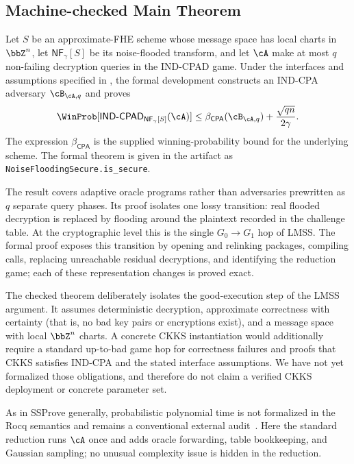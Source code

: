 \subsection{Machine-checked Main Theorem}
\label{sec:scope}

Let \(S\) be an approximate-FHE scheme whose message space has local charts in
\(\bbZ^n\), let \(\mathsf{NF}_{\gamma}[S]\) be its noise-flooded transform, and
let \(\cA\) make at most \(q\) non-failing decryption queries in the IND-CPAD
game.
Under the interfaces and assumptions specified in
, the formal development constructs an IND-CPA
adversary \(\cB_{\cA,q}\) and proves
\begin{equation}
\label{eq:headline}
 \WinProb[\mathsf{IND\text{-}CPAD}_{\mathsf{NF}_{\gamma}[S]}(\cA)]
 \leq
 \beta_{\mathsf{CPA}}(\cB_{\cA,q})+
 \frac{\sqrt{qn}}{2\gamma}.
\end{equation}
The expression \(\beta_{\mathsf{CPA}}\) is the supplied winning-probability
bound for the underlying scheme.
The formal theorem is given in the artifact as
\texttt{NoiseFloodingSecure.is\_secure}.

The result covers adaptive oracle programs rather than adversaries prewritten as \(q\) separate query phases.
Its proof isolates one lossy transition: real flooded decryption is replaced by flooding around the plaintext recorded in the challenge table.
At the cryptographic level this is the single \(G_0\to G_1\) hop of LMSS.
The formal proof exposes this transition by opening and relinking packages,
compiling calls, replacing unreachable residual decryptions, and identifying
the reduction game; each of these representation changes is proved exact.

The checked theorem deliberately isolates the good-execution step of the LMSS
argument.
It assumes deterministic decryption, approximate correctness with certainty
(that is, no bad key pairs or encryptions exist), and a message space with local
\(\bbZ^n\) charts.
A concrete CKKS instantiation would additionally require a standard up-to-bad game hop
for correctness failures and proofs that CKKS satisfies IND-CPA and the stated
interface assumptions.
We have not yet formalized those obligations, and therefore do not claim a verified
CKKS deployment or concrete parameter set.

As in SSProve generally, probabilistic polynomial time is not formalized in the
Rocq semantics and remains a conventional external
audit~\cite{ssprove}.
Here the standard reduction runs \(\cA\) once and adds oracle forwarding, table
bookkeeping, and Gaussian sampling; no unusual complexity issue is hidden in
the reduction.


